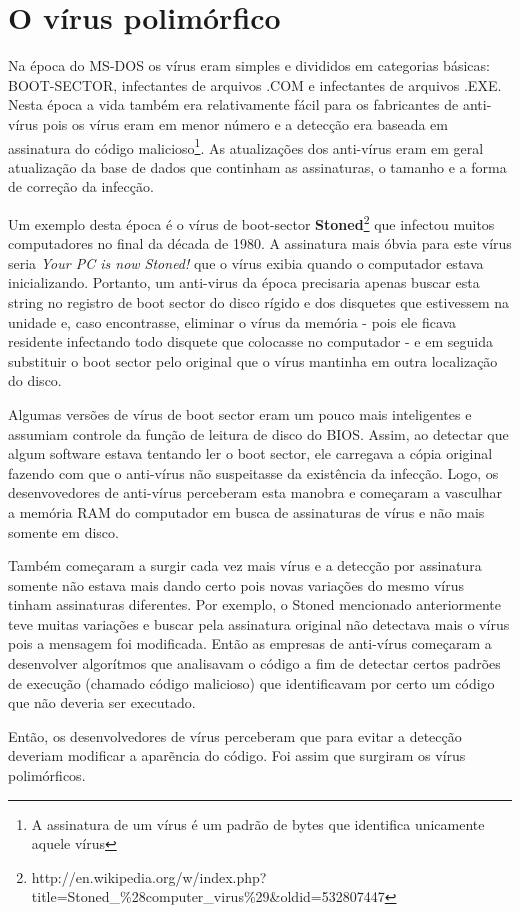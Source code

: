 \chapter{O vírus polimórfico}

Na época do MS-DOS os vírus eram simples e divididos em categorias básicas: BOOT-SECTOR, infectantes de arquivos .COM e infectantes de arquivos .EXE. Nesta época a vida também era relativamente fácil para os fabricantes de anti-vírus pois os vírus eram em menor número e a detecção era baseada em assinatura do código malicioso\footnote{A assinatura de um vírus é um padrão de bytes que identifica unicamente aquele vírus}. As atualizações dos anti-vírus eram em geral atualização da base de dados que continham as assinaturas, o tamanho e a forma de correção da infecção.

Um exemplo desta época é o vírus de boot-sector \textbf{Stoned}\footnote{http://en.wikipedia.org/w/index.php?title=Stoned\_\%28computer\_virus\%29\&oldid=532807447} que infectou muitos computadores no final da década de 1980. A assinatura mais óbvia para este vírus seria \textit{Your PC is now Stoned!} que o vírus exibia quando o computador estava inicializando. Portanto, um anti-virus da época precisaria apenas buscar esta string no registro de boot sector do disco rígido e dos disquetes que estivessem na unidade e, caso encontrasse, eliminar o vírus da memória - pois ele ficava residente infectando todo disquete que colocasse no computador - e em seguida substituir o boot sector pelo original que o vírus mantinha em outra localização do disco.

Algumas versões de vírus de boot sector eram um pouco mais inteligentes e assumiam controle da função de leitura de disco do BIOS. Assim, ao detectar que algum software estava tentando ler o boot sector, ele carregava a cópia original fazendo com que o anti-vírus não suspeitasse da existência da infecção. Logo, os desenvovedores de anti-vírus perceberam esta manobra e começaram a vasculhar a memória RAM do computador em busca de assinaturas de vírus e não mais somente em disco.

Também começaram a surgir cada vez mais vírus e a detecção por assinatura somente não estava mais dando certo pois novas variações do mesmo vírus tinham assinaturas diferentes. Por exemplo, o Stoned mencionado anteriormente teve muitas variações e buscar pela assinatura original não detectava mais o vírus pois a mensagem foi modificada. Então as empresas de anti-vírus começaram a desenvolver algorítmos que analisavam o código a fim de detectar certos padrões de execução (chamado código malicioso) que identificavam por certo um código que não deveria ser executado.

Então, os desenvolvedores de vírus perceberam que para evitar a detecção deveriam modificar a aparẽncia do código. Foi assim que surgiram os vírus polimórficos.
